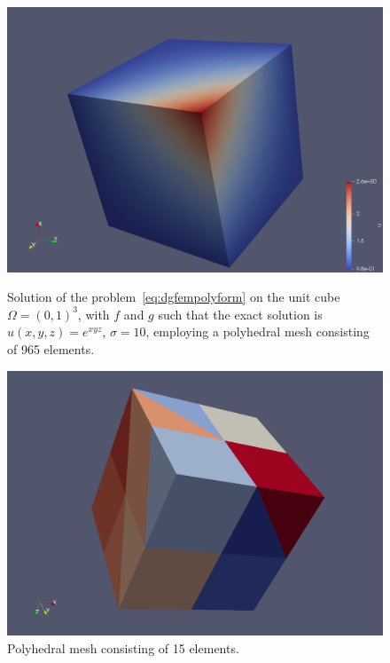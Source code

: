 \documentclass[12pt, a4paper]{article}
\theoremstyle{definition}
\theoremstyle{plain}
\theoremstyle{plain}
\theoremstyle{definition}
\begin{document}
\begin{figure}[h!] 
	\centering
	\includegraphics[scale=0.15]{solution_3072p}
	\caption{Solution of the problem~\eqref{eq:dgfempolyform} on the unit cube 
	$\Omega = (0,1)^3$, with $f$ and $g$ such that the exact solution is 
	$u(x,y,z)=e^{xyz}$, $\sigma=10$, employing a polyhedral mesh consisting of 
	965 elements.}
	\label{fig:sol}
	\includegraphics[scale=0.30]{mesh_48p}
	\caption{Polyhedral mesh consisting of 15 elements.}
	\label{fig:mesh}
\end{figure}
\clearpage
\end{document}
